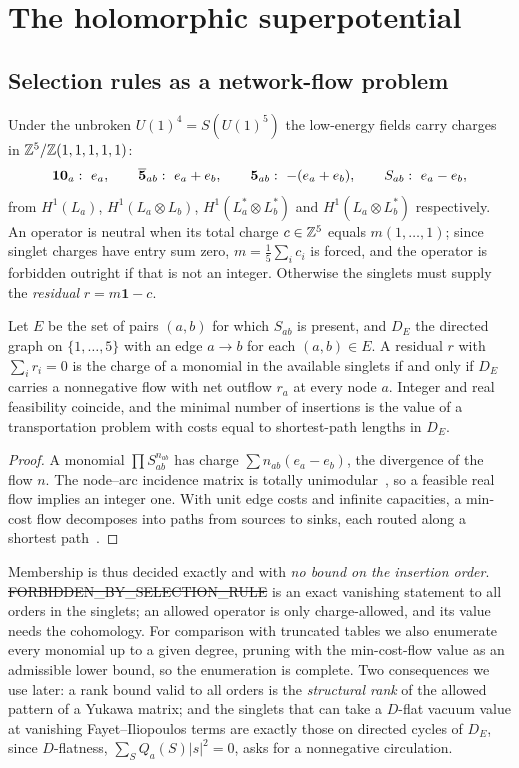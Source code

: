 \section{The holomorphic superpotential}
\label{sec:yukawa}

\subsection{Selection rules as a network-flow problem}

Under the unbroken $U(1)^4=S(U(1)^5)$ the low-energy fields carry charges in
$\mathbb{Z}^5/\mathbb{Z}(1,1,1,1,1)$:
\[
\mathbf{10}_a:\ e_a,\qquad \overline{\mathbf{5}}_{ab}:\ e_a+e_b,\qquad \mathbf{5}_{ab}:\ -(e_a+e_b),\qquad
S_{ab}:\ e_a-e_b,
\]
from $H^1(L_a)$, $H^1(L_a\otimes L_b)$, $H^1(L_a^*\otimes L_b^*)$ and
$H^1(L_a\otimes L_b^*)$ respectively. An operator is neutral when its total
charge $c\in\mathbb{Z}^5$ equals $m(1,\dots,1)$; since singlet charges have entry sum
zero, $m=\tfrac15\sum_ic_i$ is forced, and the operator is forbidden outright if
that is not an integer. Otherwise the singlets must supply the \emph{residual}
$r=m\mathbf1-c$.

\begin{proposition}\label{prop:flow}
Let $E$ be the set of pairs $(a,b)$ for which $S_{ab}$ is present, and $D_E$ the
directed graph on $\{1,\dots,5\}$ with an edge $a\to b$ for each $(a,b)\in E$. A
residual $r$ with $\sum_ir_i=0$ is the charge of a monomial in the available
singlets if and only if $D_E$ carries a nonnegative flow with net outflow $r_a$
at every node $a$. Integer and real feasibility coincide, and the minimal number
of insertions is the value of a transportation problem with costs equal to
shortest-path lengths in $D_E$.
\end{proposition}
\begin{proof}
A monomial $\prod S_{ab}^{n_{ab}}$ has charge $\sum n_{ab}(e_a-e_b)$, the divergence
of the flow $n$. The node--arc incidence matrix is totally
unimodular~\cite{Schrijver1986}, so a feasible real flow implies an integer one.
With unit edge costs and infinite capacities, a min-cost flow decomposes into
paths from sources to sinks, each routed along a shortest path~\cite{AMO1993}.
\end{proof}

Membership is thus decided exactly and with \emph{no bound on the insertion
order}. \st{FORBIDDEN\_BY\_SELECTION\_RULE} is an exact vanishing statement to
all orders in the singlets; an allowed operator is only charge-allowed, and its
value needs the cohomology. For comparison with truncated tables we also
enumerate every monomial up to a given degree, pruning with the min-cost-flow
value as an admissible lower bound, so the enumeration is complete. Two
consequences we use later: a rank bound valid to all orders is the
\emph{structural rank} of the allowed pattern of a Yukawa matrix; and the
singlets that can take a $D$-flat vacuum value at vanishing Fayet--Iliopoulos
terms are exactly those on directed cycles of $D_E$, since $D$-flatness,
$\sum_SQ_a(S)|s|^2=0$, asks for a nonnegative circulation.

